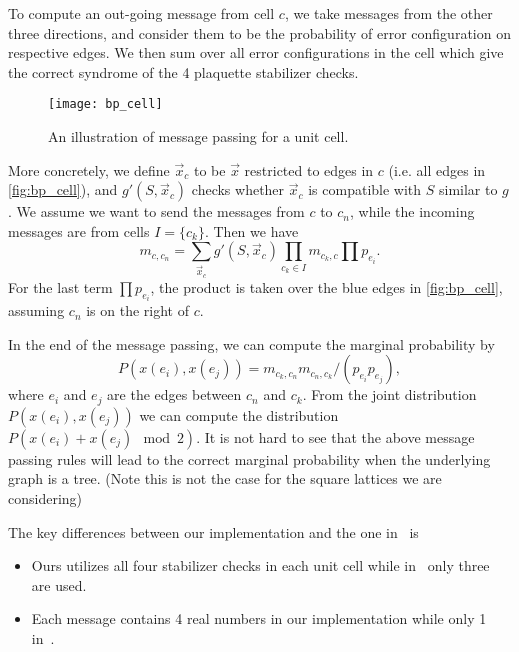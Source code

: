 To compute an out-going message from cell $c$, we take messages from the other three directions, and consider them to be the probability of error configuration on respective edges.
We then sum over all error configurations in the cell which give the correct syndrome of the 4 plaquette stabilizer checks.
\begin{figure}
	\texttt{[image: bp\_cell]}
	\caption{An illustration of message passing for a unit cell.}
	\label{fig:bp_cell}
\end{figure}
More concretely, we define $\vec{x}_c$ to be $\vec{x}$ restricted to edges in $c$ (i.e. all edges in \autoref{fig:bp_cell}), and $g'(S, \vec{x}_c)$ checks whether $\vec{x}_c$ is compatible with $S$ similar to $g$.
We assume we want to send the messages from $c$ to $c_n$, while the incoming messages are from cells $I = \{c_k\}$.
Then we have
\begin{equation}
m_{c, c_n} = \sum_{\vec{x}_c} g'(S, \vec{x}_c)\prod_{c_k\in I} m_{c_k, c} \prod p_{e_i}.
\end{equation}
For the last term $\prod p_{e_i}$, the product is taken over the blue edges in \autoref{fig:bp_cell}, assuming $c_n$ is on the right of $c$.

In the end of the message passing, we can compute the marginal probability by
\begin{equation}
P(x(e_i),x(e_j)) = m_{c_k, c_n}m_{c_n,c_k} / \left(p_{e_i}p_{e_j}\right) ,
\end{equation}
where $e_i$ and $e_j$ are the edges between $c_n$ and $c_k$.
From the joint distribution $P(x(e_i),x(e_j))$ we can compute the distribution $P\left(x(e_i)+x(e_j)\mod 2\right)$.
It is not hard to see that the above message passing rules will lead to the correct marginal probability when the underlying graph is a tree.
(Note this is not the case for the square lattices we are considering)

The key differences between our implementation and the one in~\cite{duclos2013fault} is
\begin{itemize}
	\item Ours utilizes all four stabilizer checks in each unit cell while in~\cite{duclos2013fault} only three are used.
	\item Each message contains 4 real numbers in our implementation while only 1 in~\cite{duclos2013fault}.
\end{itemize}
